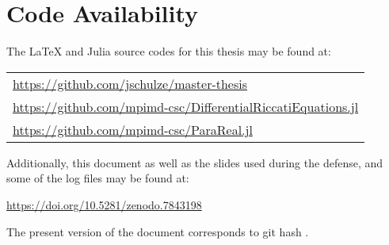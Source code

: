\section*{Code Availability}

The \LaTeX{} and Julia source codes for this thesis may be found at:
\begin{center}
\begin{tabular}{l}
  \url{https://github.com/jschulze/master-thesis} \\
  \url{https://github.com/mpimd-csc/DifferentialRiccatiEquations.jl} \\
  \url{https://github.com/mpimd-csc/ParaReal.jl}
\end{tabular}
\end{center}
Additionally, this document as well as the slides used during the defense,
and some of the log files may be found at:
\begin{center}
  \url{https://doi.org/10.5281/zenodo.7843198}
\end{center}
The present version of the document corresponds to git hash
\code{}\unskip.
